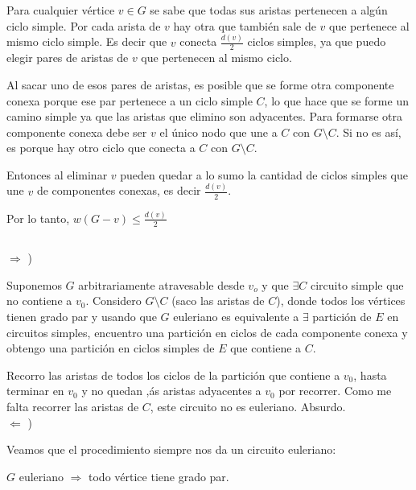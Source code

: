 Para cualquier vértice $v \in G$ se sabe que todas sus aristas pertenecen a algún ciclo simple. Por cada arista de $v$ hay otra que también sale de $v$ que pertenece al mismo ciclo simple. Es decir que $v$ conecta $\frac{d(v)}{2}$ ciclos simples, ya que puedo elegir pares de aristas de $v$ que pertenecen al mismo ciclo.

Al sacar uno de esos pares de aristas, es posible que se forme otra componente conexa porque ese par pertenece a un ciclo simple $C$, lo que hace que se forme un camino simple ya que las aristas que elimino son adyacentes. Para formarse otra componente conexa debe ser $v$ el único nodo que une a $C$ con $G \setminus C$. Si no es así, es porque hay otro ciclo que conecta a $C$ con $G \setminus C$.

Entonces al eliminar $v$ pueden quedar a lo sumo la cantidad de ciclos simples que une $v$ de componentes conexas, es decir $\frac{d(v)}{2}$.

Por lo tanto, $w(G - v) \leq \frac{d(v)}{2}$

\setcounter{subsection}{6}
\subsection{}

\subsubsection{}

$\Longrightarrow$ )

Suponemos $G$ arbitrariamente atravesable desde $v_o$ y que $\exists C$ circuito simple que no contiene a $v_0$. Considero $G \setminus C$ (saco las aristas de $C$), donde todos los vértices tienen grado par y usando que $G$ euleriano es equivalente a $\exists$ partición de $E$ en circuitos simples, encuentro una partición en ciclos de cada componente conexa y obtengo una partición en ciclos simples de $E$ que contiene a $C$.

Recorro las aristas de todos los ciclos de la partición que contiene a $v_0$, hasta terminar en $v_0$ y no quedan ,ás aristas adyacentes a $v_0$ por recorrer. Como me falta recorrer las aristas de $C$, este circuito no es euleriano. Absurdo. \\

$\Longleftarrow$ )

Veamos que el procedimiento siempre nos da un circuito euleriano:

$G$ euleriano $\Longrightarrow$ todo vértice tiene grado par.

